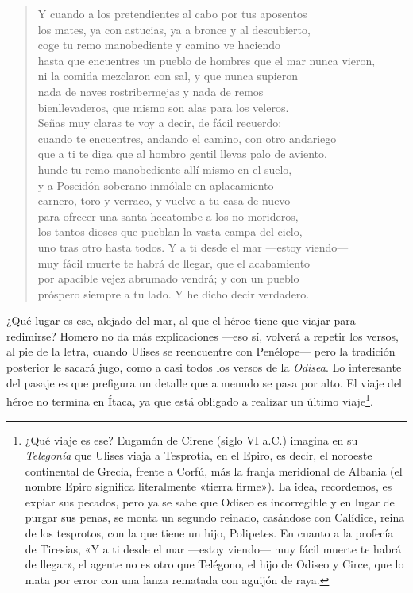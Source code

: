 \begin{verse}
Y cuando a los pretendientes al cabo por tus aposentos\\
los mates, ya con astucias, ya a bronce y al descubierto,\\
coge tu remo manobediente y camino ve haciendo\\
hasta que encuentres un pueblo de hombres que el mar nunca vieron,\\
ni la comida mezclaron con sal, y que nunca supieron\\
nada de naves rostribermejas y nada de remos\\
bienllevaderos, que mismo son alas para los veleros.\\
Señas muy claras te voy a decir, de fácil recuerdo:\\
cuando te encuentres, andando el camino, con otro andariego\\
que a ti te diga que al hombro gentil llevas palo de aviento,\\
hunde tu remo manobediente allí mismo en el suelo,\\
y a Poseidón soberano inmólale en aplacamiento\\
carnero, toro y verraco, y vuelve a tu casa de nuevo\\
para ofrecer una santa hecatombe a los no morideros,\\
los tantos dioses que pueblan la vasta campa del cielo,\\
uno tras otro hasta todos. Y a ti desde el mar ---estoy viendo---\\
muy fácil muerte te habrá de llegar, que el acabamiento\\
por apacible vejez abrumado vendrá; y con un pueblo\\
próspero siempre a tu lado. Y he dicho decir verdadero.
\end{verse}

¿Qué lugar es ese, alejado del mar, al que el héroe tiene que viajar para redimirse? Homero no da más explicaciones ---eso sí, volverá a repetir los versos, al pie de la letra, cuando Ulises se reencuentre con Penélope--- pero la tradición posterior le sacará jugo, como a casi todos los versos de la \emph{Odisea}. Lo interesante del pasaje es que prefigura un detalle que a menudo se pasa por alto. El viaje del héroe no termina en Ítaca, ya que está obligado a realizar un último viaje\footnote{¿Qué viaje es ese? Eugamón de Cirene (siglo VI a.C.) imagina en su \emph{Telegonía} que Ulises viaja a Tesprotia, en el Epiro, es decir, el noroeste continental de Grecia, frente a Corfú, más la franja meridional de Albania (el nombre Epiro significa literalmente «tierra firme»). La idea, recordemos, es expiar sus pecados, pero ya se sabe que Odiseo es incorregible y en lugar de purgar sus penas, se monta un segundo reinado, casándose con Calídice, reina de los tesprotos, con la que tiene un hijo, Polipetes. En cuanto a la profecía de Tiresias, «Y a ti desde el mar ---estoy viendo--- muy fácil muerte te habrá de llegar», el agente no es otro que Telégono, el hijo de Odiseo y Circe, que lo mata por error con una lanza rematada con aguijón de raya.}.

